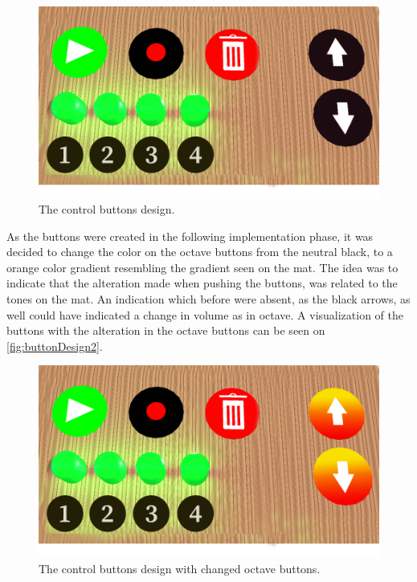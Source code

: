\begin{figure}[H]
	\centering
	\includegraphics[width=0.7\linewidth]{figure/Design/buttonDesign}
	\caption{The control buttons design.}
	\label{fig:buttonDesign}
\end{figure}


As the buttons were created in the following implementation phase, it was decided to change the color on the octave buttons from the neutral black, to a orange color gradient resembling the gradient seen on the mat. The idea was to indicate that the alteration made when pushing the buttons, was related to the tones on the mat. An indication which before were absent, as the black arrows, as well could have indicated a change in volume as in octave. A visualization of the buttons with the alteration in the octave buttons can be seen on \autoref{fig:buttonDesign2}.
\begin{figure}[H]
	\centering
	\includegraphics[width=0.7\linewidth]{figure/Design/buttonDesign2}
	\caption{The control buttons design with changed octave buttons.}
	\label{fig:buttonDesign2}
\end{figure}


